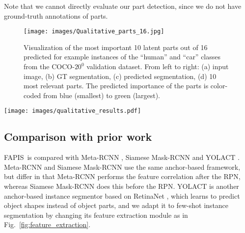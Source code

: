\documentclass[final]{cvpr}
\def\Approach{FAPIS}
\begin{document}
Note that we cannot directly evaluate our part detection, since we do not have ground-truth annotations of parts.


\begin{figure}[h!]
    \centering
    \texttt{[image: images/Qualitative\_parts\_16.jpg]}
    \caption{Visualization of the most important 10 latent parts out of 16 predicted for example instances of the ``human'' and ``car'' classes from the COCO-$20^0$ validation dataset. From left to right: (a) input image, (b) GT segmentation, (c) predicted segmentation, (d) 10 most relevant parts. The predicted importance of the parts is color-coded from blue (smallest) to green (largest).}
    \label{fig:qualitative_parts_16}
\end{figure}

\begin{figure*}[h!]
    \centering
    \texttt{[image: images/qualitative\_results.pdf]}
    \caption{Our one-shot instance segmentation on COCO-$20^0$. For each pair of images, the support is the smaller and the query is the larger image. Results for the segmentation and bounding-box detection of each instance are marked with  distinct colors in the query. The green border indicates success, and the red border marks failure. \Approach~typically fails when instances in the support image are very different in appearance, shape, or 3D pose from instances in the query.  Best viewed in color.}
    \label{fig:qualitative_part0}
\end{figure*}


\subsection{Comparison with prior work}
\Approach~is compared with Meta-RCNN \cite{yanICCV19metarcnn}, Siamese Mask-RCNN \cite{michaelis2018one} and YOLACT \cite{bolya2019yolact}. Meta-RCNN and Siamese Mask-RCNN use the same anchor-based framework, but differ in that Meta-RCNN performs the feature correlation after the RPN, whereas Siamese Mask-RCNN does this before the RPN. YOLACT is another anchor-based instance segmentor based on RetinaNet \cite{lin2017focal}, which learns to predict object shapes instead of object parts, and we adapt it to few-shot instance segmentation by changing its feature extraction module as in Fig.~\ref{fig:feature_extraction}.
\end{document}
